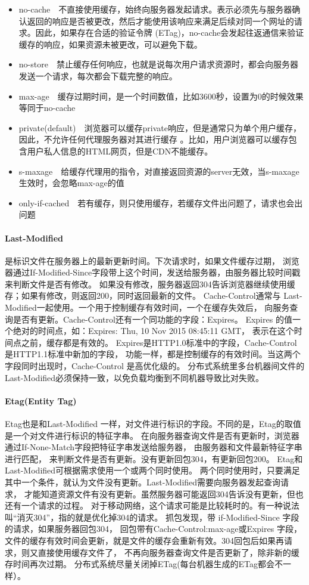 \documentclass{book}
\begin{document}
\begin{itemize}
\item{no-cache}~~不直接使用缓存，始终向服务器发起请求。表示必须先与服务器确认返回的响应是否被更改，然后才能使用该响应来满足后续对同一个网址的请求。因此，如果存在合适的验证令牌 (ETag)，no-cache会发起往返通信来验证缓存的响应，如果资源未被更改，可以避免下载。
\item{no-store}~~禁止缓存任何响应，也就是说每次用户请求资源时，都会向服务器发送一个请求，每次都会下载完整的响应。
\item{max-age}~~缓存过期时间，是一个时间数值，比如3600秒，设置为0的时候效果等同于no-cache
\item{private(default)}~~浏览器可以缓存private响应，但是通常只为单个用户缓存，因此，不允许任何代理服务器对其进行缓存 。比如，用户浏览器可以缓存包含用户私人信息的HTML网页，但是CDN不能缓存。
\item{s-maxage}~~给缓存代理用的指令，对直接返回资源的server无效，当s-maxage生效时，会忽略max-age的值
\item{only-if-cached}~~若有缓存，则只使用缓存，若缓存文件出问题了，请求也会出问题
\end{itemize}

\paragraph{Last-Modified}是标识文件在服务器上的最新更新时间。下次请求时，如果文件缓存过期，
浏览器通过If-Modified-Since字段带上这个时间，发送给服务器，由服务器比较时间戳来判断文件是否有修改。
如果没有修改，服务器返回304告诉浏览器继续使用缓存；如果有修改，则返回200，同时返回最新的文件。
Cache-Control通常与 Last-Modified一起使用。一个用于控制缓存有效时间，一个在缓存失效后，
向服务查询是否有更新。Cache-Control还有一个同功能的字段：Expires。
Expires 的值一个绝对的时间点，如：Expires: Thu, 10 Nov 2015 08:45:11 GMT，
表示在这个时间点之前，缓存都是有效的。
Expires是HTTP1.0标准中的字段，Cache-Control是HTTP1.1标准中新加的字段，
功能一样，都是控制缓存的有效时间。当这两个字段同时出现时，Cache-Control 是高优化级的。
分布式系统里多台机器间文件的Last-Modified必须保持一致，以免负载均衡到不同机器导致比对失败。

\paragraph{Etag(Entity Tag)}Etag也是和Last-Modified 一样，对文件进行标识的字段。不同的是，Etag的取值是一个对文件进行标识的特征字串。
在向服务器查询文件是否有更新时，浏览器通过If-None-Match字段把特征字串发送给服务器，
由服务器和文件最新特征字串进行匹配，
来判断文件是否有更新。没有更新回包304，有更新回包200。
Etag和Last-Modified可根据需求使用一个或两个同时使用。
两个同时使用时，只要满足其中一个条件，就认为文件没有更新。Last-Modified需要向服务器发起查询请求，
才能知道资源文件有没有更新。虽然服务器可能返回304告诉没有更新，但也还有一个请求的过程。
对于移动网络，这个请求可能是比较耗时的。有一种说法叫“消灭304”，指的就是优化掉304的请求。
抓包发现，带 if-Modified-Since 字段的请求，如果服务器回包304，
回包带有Cache-Control:max-age或Expires 字段，
文件的缓存有效时间会更新，就是文件的缓存会重新有效。304回包后如果再请求，则又直接使用缓存文件了，
不再向服务器查询文件是否更新了，除非新的缓存时间再次过期。
分布式系统尽量关闭掉ETag(每台机器生成的ETag都会不一样）。
\end{document}
